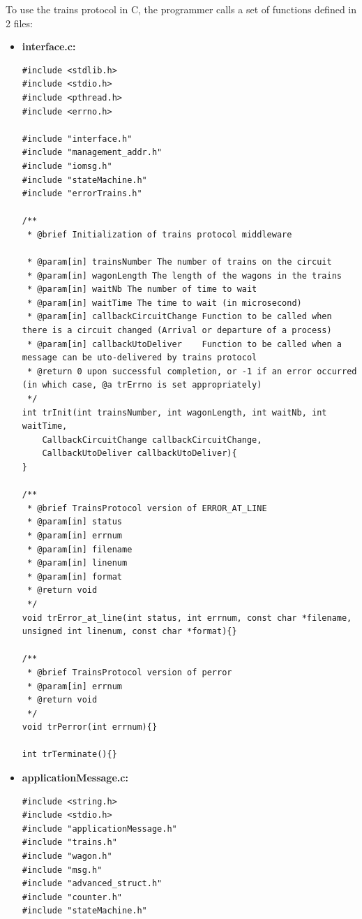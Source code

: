 \documentclass[a4paper,10pt]{report}
\begin{document}
To use the trains protocol in C, the programmer calls a set of functions defined in 2 files:
\begin{itemize}
  \item \textbf{interface.c:}\\ 

\lstset{language=C}
\lstset{commentstyle=\textit} 
\begin{lstlisting}
#include <stdlib.h>
#include <stdio.h>
#include <pthread.h>
#include <errno.h>

#include "interface.h"
#include "management_addr.h"
#include "iomsg.h"
#include "stateMachine.h"
#include "errorTrains.h"

/**
 * @brief Initialization of trains protocol middleware

 * @param[in] trainsNumber The number of trains on the circuit
 * @param[in] wagonLength The length of the wagons in the trains
 * @param[in] waitNb The number of time to wait
 * @param[in] waitTime The time to wait (in microsecond)
 * @param[in] callbackCircuitChange Function to be called when there is a circuit changed (Arrival or departure of a process)
 * @param[in] callbackUtoDeliver    Function to be called when a message can be uto-delivered by trains protocol
 * @return 0 upon successful completion, or -1 if an error occurred (in which case, @a trErrno is set appropriately)
 */
int trInit(int trainsNumber, int wagonLength, int waitNb, int waitTime,
    CallbackCircuitChange callbackCircuitChange,
    CallbackUtoDeliver callbackUtoDeliver){
}

/**
 * @brief TrainsProtocol version of ERROR_AT_LINE
 * @param[in] status
 * @param[in] errnum
 * @param[in] filename
 * @param[in] linenum
 * @param[in] format
 * @return void
 */
void trError_at_line(int status, int errnum, const char *filename, unsigned int linenum, const char *format){}

/**
 * @brief TrainsProtocol version of perror
 * @param[in] errnum
 * @return void
 */
void trPerror(int errnum){}

int trTerminate(){}
\end{lstlisting}

  \item \textbf{applicationMessage.c:}\\
\lstset{language=C}
\lstset{commentstyle=\textit} 
\begin{lstlisting}
#include <string.h>
#include <stdio.h>
#include "applicationMessage.h"
#include "trains.h"
#include "wagon.h"
#include "msg.h"
#include "advanced_struct.h"
#include "counter.h"
#include "stateMachine.h"


\end{lstlisting}
\end{itemize}
\end{document}
